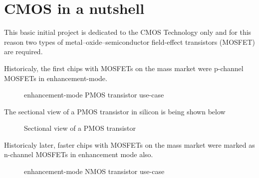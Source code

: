 \section{CMOS in a nutshell}\label{cmos_nutshell}
This basic initial project is dedicated to the CMOS Technology only and for this reason two types of metal–oxide–semiconductor field-effect transistors (MOSFET) are required.

Historicaly, the first chips with MOSFETs on the mass market were p-channel MOSFETs in enhancement-mode.

\begin{figure}[H]
	\centering
	\begin{circuitdiagram}{20}{20}
	\end{circuitdiagram}
	\caption{enhancement-mode PMOS transistor use-case}
\end{figure}

The sectional view of a PMOS transistor in silicon is being shown below
\begin{figure}[H]
	\centering
	\begin{tikzpicture}[node distance = 3cm, auto, thick,scale=0.5, every node/.style={transform shape}]
		
	\end{tikzpicture}
	\caption{Sectional view of a PMOS transistor}
\end{figure}

Historicaly later, faster chips with MOSFETs on the mass market were marked as n-channel MOSFETs in enhancement mode also.

\begin{figure}[H]
	\centering
	\begin{circuitdiagram}{20}{20}
	\end{circuitdiagram}
	\caption{enhancement-mode NMOS transistor use-case}
\end{figure}

